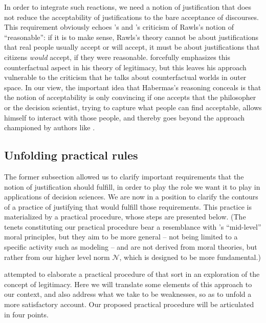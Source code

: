 \documentclass[preprint, french, english, 11pt, authoryear]{elsarticle}%
\newcommand{\possessivecite}[1]{\citeauthor{#1}’s \citeyearpar{#1}}
\begin{document}
In order to integrate such reactions, we need a notion of justification that does not reduce the acceptability of justifications to the bare acceptance of discourses. 
This requirement obviously echoes \citeauthor{habermas_reconciliation_1995}’s and \citeauthor{estlund_democratic_2009}’s criticism of Rawls's notion of “reasonable”: 
if it is to make sense, Rawls's theory cannot be about justifications that real people usually accept or will accept, it must be about justifications that citizens \emph{would} accept, if they were reasonable. 
\citet{habermas_faktizitat_1992} forcefully emphasizes this counterfactual aspect in his theory of legitimacy, but this leaves his approach vulnerable to the criticism that he talks about counterfactual worlds in outer space. 
In our view, the important idea that Habermas's reasoning conceals is that the notion of acceptability is only convincing if one accepts that the philosopher or the decision scientist, trying to capture what people can find acceptable, 
allows himself to interact with those people, and thereby goes beyond the approach championed by authors like \cite{boltanski_justification_2006}.

\subsection{Unfolding practical rules}
The former subsection allowed us to clarify important requirements that the notion of justification should fulfill, in order to play the role we want it to play in applications of decision sciences. 
We are now in a position to clarify the contours of a practice of justifying that would fulfill those requirements. This practice is materialized by a practical procedure, whose steps are presented below. 
(The tenets constituting our practical procedure bear a resemblance with \possessivecite{diekmann_moral_2013} ``mid-level'' moral principles, but they aim to be more general -- not being limited to a specific activity such as modeling -- 
and are not derived from moral theories, but rather from our higher level norm $\mathscr{N}$, which is designed to be more fundamental.)

\citet{meinard_what_2017} attempted to elaborate a practical procedure of that sort in an exploration of the concept of legitimacy. Here we will translate some elements of this approach to our context, and also address what we take to be weaknesses, so as to unfold a more satisfactory account. 
Our proposed practical procedure will be articulated in four points.
\end{document}
